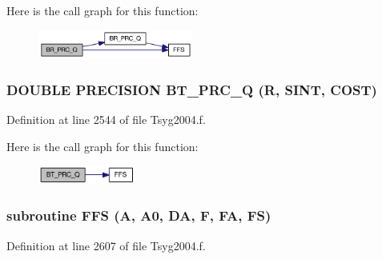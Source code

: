 Here is the call graph for this function:\nopagebreak
\begin{figure}[H]
\begin{center}
\leavevmode
\includegraphics[width=144pt]{_tsyg2004_8f_d87c020522fe895268a9166c3f8292f6_cgraph}
\end{center}
\end{figure}
\hypertarget{_tsyg2004_8f_dbd25510c3ba667598e7c14abcc5b786}{
\subsubsection[{BT\_\-PRC\_\-Q}]{\setlength{\rightskip}{0pt plus 5cm}DOUBLE PRECISION BT\_\-PRC\_\-Q (R, \/  SINT, \/  COST)}}
\label{_tsyg2004_8f_dbd25510c3ba667598e7c14abcc5b786}




Definition at line 2544 of file Tsyg2004.f.

Here is the call graph for this function:\nopagebreak
\begin{figure}[H]
\begin{center}
\leavevmode
\includegraphics[width=91pt]{_tsyg2004_8f_dbd25510c3ba667598e7c14abcc5b786_cgraph}
\end{center}
\end{figure}
\hypertarget{_tsyg2004_8f_8d9b5c31c4fb074683c40c0fa923c3a2}{
\subsubsection[{FFS}]{\setlength{\rightskip}{0pt plus 5cm}subroutine FFS (A, \/  A0, \/  DA, \/  F, \/  FA, \/  FS)}}
\label{_tsyg2004_8f_8d9b5c31c4fb074683c40c0fa923c3a2}




Definition at line 2607 of file Tsyg2004.f.

